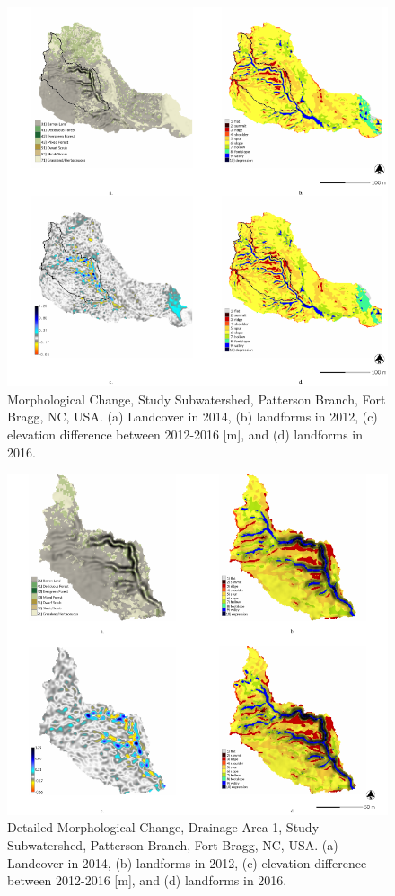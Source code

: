 \documentclass[gmd, manuscript]{copernicus}
\begin{document}
\begin{figure}
\center
\includegraphics[width=\textwidth,height=0.95\textheight,keepaspectratio]{figures/study_area.pdf}
\caption{Morphological Change, Study Subwatershed, Patterson Branch, Fort Bragg, NC, USA.
(a) Landcover in 2014, 
(b) landforms in 2012,
(c) elevation difference between 2012-2016 [m], and
(d) landforms in 2016.
}
\label{fig:study_area}
\end{figure}

\begin{figure}
\center
\includegraphics[width=\textwidth,height=0.95\textheight,keepaspectratio]{figures/study_area_detail.pdf}
\caption{Detailed Morphological Change, Drainage Area 1, Study Subwatershed, Patterson Branch, Fort Bragg, NC, USA.
(a) Landcover in 2014, 
(b) landforms in 2012,
(c) elevation difference between 2012-2016 [m], and
(d) landforms in 2016.
}
\label{fig:study_area_detail}
\end{figure}
\end{document}
